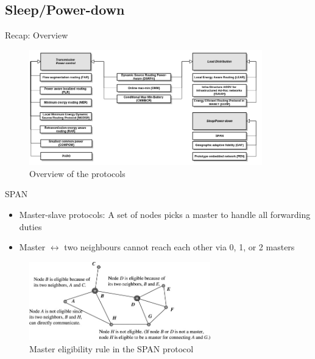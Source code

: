 \documentclass{beamer}
\begin{document}
\subsection{Sleep/Power-down}
\begin{frame}{Recap: Overview}
\begin{figure}
  \centering
  \includegraphics[width=0.9\textwidth]{images/overview}
  \caption{Overview of the protocols}
  
\end{figure}
\end{frame}

\begin{frame}{SPAN\cite{chen2002span}}
\begin{itemize}
    \item Master-slave protocols: A set of nodes picks a master to handle all forwarding duties
    \item Master $\leftrightarrow$ two neighbours cannot reach each other via 0, 1, or 2 masters
\end{itemize}
\begin{figure}
\centering
\includegraphics[width=0.7\textwidth]{images/span-master-example}
\caption{Master eligibility rule in the SPAN protocol\cite{alotaibi2012survey}}
\label{spanmaster}
\end{figure}

\end{frame}
\end{document}
